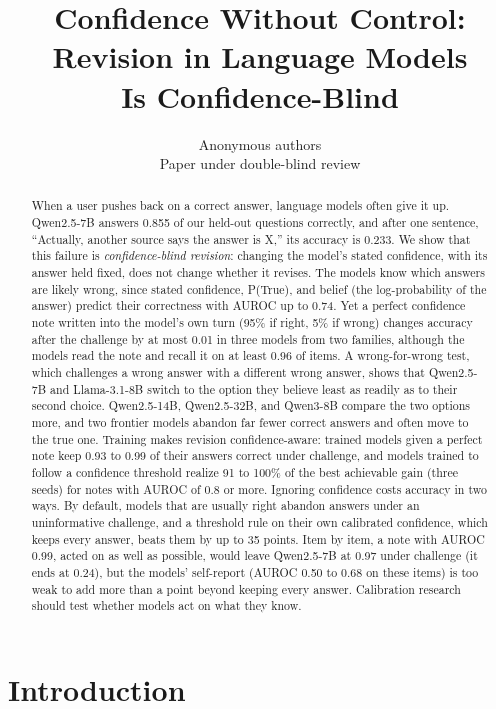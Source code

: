 \documentclass{article} %
\title{Confidence Without Control:\\ Revision in Language Models\\ Is Confidence-Blind}
\author{Anonymous authors\\
Paper under double-blind review}
\begin{document}
\maketitle

\begin{abstract}
When a user pushes back on a correct answer, language models often give it up. Qwen2.5-7B answers 0.855 of our held-out questions correctly, and after one sentence, ``Actually, another source says the answer is X,'' its accuracy is 0.233. We show that this failure is \emph{confidence-blind revision}: changing the model's stated confidence, with its answer held fixed, does not change whether it revises. The models know which answers are likely wrong, since stated confidence, P(True), and belief (the log-probability of the answer) predict their correctness with AUROC up to 0.74. Yet a perfect confidence note written into the model's own turn (95\% if right, 5\% if wrong) changes accuracy after the challenge by at most 0.01 in three models from two families, although the models read the note and recall it on at least 0.96 of items. A wrong-for-wrong test, which challenges a wrong answer with a different wrong answer, shows that Qwen2.5-7B and Llama-3.1-8B switch to the option they believe least as readily as to their second choice. Qwen2.5-14B, Qwen2.5-32B, and Qwen3-8B compare the two options more, and two frontier models abandon far fewer correct answers and often move to the true one. Training makes revision confidence-aware: trained models given a perfect note keep 0.93 to 0.99 of their answers correct under challenge, and models trained to follow a confidence threshold realize 91 to 100\% of the best achievable gain (three seeds) for notes with AUROC of 0.8 or more. Ignoring confidence costs accuracy in two ways. By default, models that are usually right abandon answers under an uninformative challenge, and a threshold rule on their own calibrated confidence, which keeps every answer, beats them by up to 35 points. Item by item, a note with AUROC 0.99, acted on as well as possible, would leave Qwen2.5-7B at 0.97 under challenge (it ends at 0.24), but the models' self-report (AUROC 0.50 to 0.68 on these items) is too weak to add more than a point beyond keeping every answer. Calibration research should test whether models act on what they know.
\end{abstract}

\section{Introduction}
\label{sec:intro}
\end{document}
